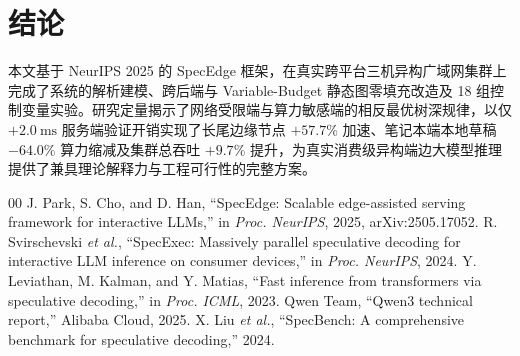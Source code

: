 \documentclass[conference]{IEEEtran}
\begin{document}
\section{结论}

本文基于 NeurIPS 2025 的 SpecEdge 框架，在真实跨平台三机异构广域网集群上完成了系统的解析建模、跨后端与 Variable-Budget 静态图零填充改造及 18 组控制变量实验。研究定量揭示了网络受限端与算力敏感端的相反最优树深规律，以仅 $+2.0\ \text{ms}$ 服务端验证开销实现了长尾边缘节点 $+57.7\%$ 加速、笔记本端本地草稿 $-64.0\%$ 算力缩减及集群总吞吐 $+9.7\%$ 提升，为真实消费级异构端边大模型推理提供了兼具理论解释力与工程可行性的完整方案。

\begin{thebibliography}{00}
 J. Park, S. Cho, and D. Han, ``SpecEdge: Scalable edge-assisted serving framework for interactive LLMs,'' in \textit{Proc. NeurIPS}, 2025, arXiv:2505.17052.
 R. Svirschevski \textit{et al.}, ``SpecExec: Massively parallel speculative decoding for interactive LLM inference on consumer devices,'' in \textit{Proc. NeurIPS}, 2024.
 Y. Leviathan, M. Kalman, and Y. Matias, ``Fast inference from transformers via speculative decoding,'' in \textit{Proc. ICML}, 2023.
 Qwen Team, ``Qwen3 technical report,'' Alibaba Cloud, 2025.
 X. Liu \textit{et al.}, ``SpecBench: A comprehensive benchmark for speculative decoding,'' 2024.
\end{thebibliography}
\end{document}
